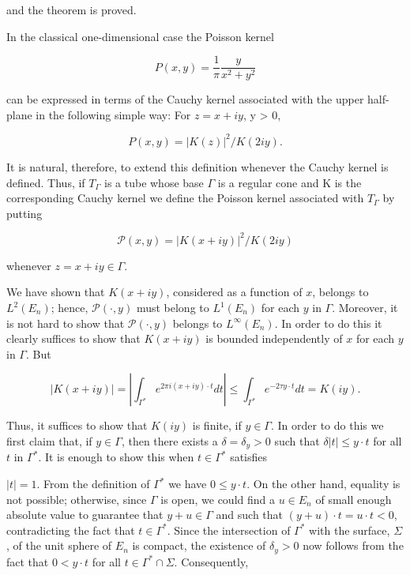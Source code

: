 and the theorem is proved.

In the classical one-dimensional case the Poisson kernel

\[
P(x,y)=\frac{1}{\pi}\frac{y}{x^{2}+y^{2}}
\]

can be expressed in terms of the Cauchy kernel associated with the upper half-plane in the following simple way: For $z = x + iy$, y > 0,

\[
P(x,y)=|K(z)|^{2}/K(2iy).
\]

It is natural, therefore, to extend this definition whenever the Cauchy kernel is defined. Thus, if $T_{\Gamma}$ is a tube whose base $\Gamma$ is a regular cone and K is the corresponding Cauchy kernel we define the Poisson kernel associated with $T_{\Gamma}$ by putting

\[
\mathcal{P}(x,y)=|K(x+i y)|^{2}/K(2i y)
\]

whenever $z = x + iy \in \Gamma$.

We have shown that $K(x + iy)$, considered as a function of $x$, belongs to $L^{2}(E_{n})$; hence, $\mathcal{P}(\cdot, y)$ must belong to $L^{1}(E_{n})$ for each $y$ in $\Gamma$. Moreover, it is not hard to show that $\mathcal{P}(\cdot, y)$ belongs to $L^{\infty}(E_{n})$. In order to do this it clearly suffices to show that $K(x + iy)$ is bounded independently of $x$ for each $y$ in $\Gamma$. But

\[
\left|K(x+i y)\right|=\left|\int_{\Gamma^{*}}e^{2\pi i(x+i y)\cdot t}d t\right|\leq\int_{\Gamma^{*}}e^{-2\tau y\cdot t}d t=K(i y).
\]

Thus, it suffices to show that $K(iy)$ is finite, if $y \in \Gamma$. In order to do this we first claim that, if $y \in \Gamma$, then there exists a $\delta = \delta_y > 0$ such that $\delta|t| \leq y \cdot t$ for all $t$ in $\Gamma^*$. It is enough to show this when $t \in \Gamma^*$ satisfies

$|t| = 1$. From the definition of $\Gamma^*$ we have $0 \leq y \cdot t$. On the other hand, equality is not possible; otherwise, since $\Gamma$ is open, we could find a $u \in E_n$ of small enough absolute value to guarantee that $y + u \in \Gamma$ and such that $(y + u) \cdot t = u \cdot t < 0$, contradicting the fact that $t \in \Gamma^*$. Since the intersection of $\Gamma^*$ with the surface, $\Sigma$, of the unit sphere of $E_n$ is compact, the existence of $\delta_y > 0$ now follows from the fact that $0 < y \cdot t$ for all $t \in \Gamma^* \cap \Sigma$. Consequently,

